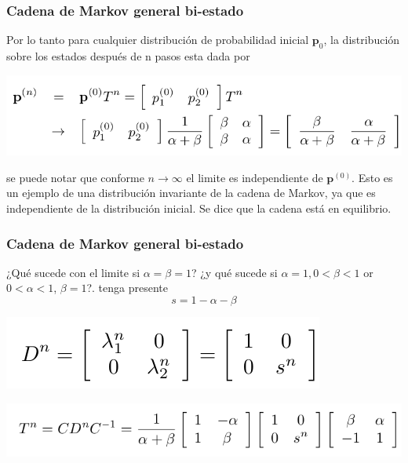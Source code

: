\documentclass[spanish]{beamer}
\begin{document}
\begin{frame}
\frametitle{Cadena de Markov general bi-estado}
Por lo tanto para cualquier distribución de probabilidad inicial $\textbf{p}_{0}$, la distribución sobre los estados después de n pasos esta dada por 
\begin{center}
\includegraphics[scale=0.4]{im18}
\end{center}
se puede notar que conforme  $n\rightarrow \infty $  el limite es independiente de $\textbf{p}^{(0)}$. Esto es un ejemplo de una distribución invariante de la cadena de Markov, ya que es independiente de la distribución inicial. Se dice que la cadena está en equilibrio.
\end{frame}
\begin{frame}
\frametitle{Cadena de Markov general bi-estado}
¿Qué sucede con el limite si $\alpha=\beta=1$? ¿y qué sucede si $\alpha = 1, 0 < \beta < 1$ or $0 < \alpha < 1$, $\beta = 1$?.
tenga presente 
\begin{equation*}
s=1-\alpha-\beta
\end{equation*}

\begin{center}
\includegraphics[scale=0.4]{im15}
\end{center}
\begin{center}
\includegraphics[scale=0.4]{im16}
\end{center}
\end{frame}
\end{document}
